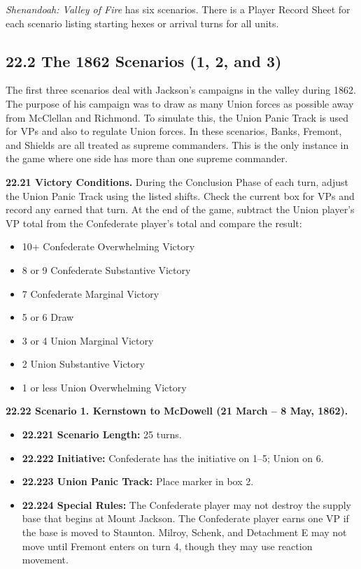 

\textit{Shenandoah: Valley of Fire} has six scenarios. There is a Player Record Sheet for each scenario listing starting hexes or arrival turns for all units.

\subsection[22.2 The 1862 Scenarios]{22.2 The 1862 Scenarios (1, 2, and 3)}

The first three scenarios deal with Jackson's campaigns in the valley during 1862. The purpose of his campaign was to draw as many Union forces as possible away from McClellan and Richmond. To simulate this, the Union Panic Track is used for VPs and also to regulate Union forces. In these scenarios, Banks, Fremont, and Shields are all treated as supreme commanders. This is the only instance in the game where one side has more than one supreme commander.

\textbf{22.21 Victory Conditions.} During the Conclusion Phase of each turn, adjust the Union Panic Track using the listed shifts. Check the current box for VPs and record any earned that turn. At the end of the game, subtract the Union player's VP total from the Confederate player's total and compare the result:
\begin{itemize}
\item 10+ Confederate Overwhelming Victory
\item 8 or 9 Confederate Substantive Victory
\item 7 Confederate Marginal Victory
\item 5 or 6 Draw
\item 3 or 4 Union Marginal Victory
\item 2 Union Substantive Victory
\item 1 or less Union Overwhelming Victory
\end{itemize}

\textbf{22.22 Scenario 1. Kernstown to McDowell (21 March -- 8 May, 1862).}
\begin{itemize}
\item \textbf{22.221 Scenario Length:} 25 turns.
\item \textbf{22.222 Initiative:} Confederate has the initiative on 1--5; Union on 6.
\item \textbf{22.223 Union Panic Track:} Place marker in box 2.
\item \textbf{22.224 Special Rules:} The Confederate player may not destroy the supply base that begins at Mount Jackson. The Confederate player earns one VP if the base is moved to Staunton. Milroy, Schenk, and Detachment E may not move until Fremont enters on turn 4, though they may use reaction movement.
\end{itemize}

